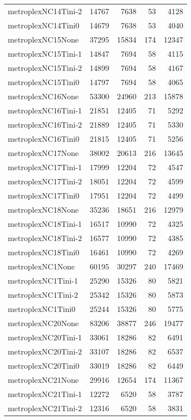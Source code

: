 \begin{longtable}{lrrrr}
metroplexNC14Tini-2 & 14767 & 7638 & 53 & 4128 \\
metroplexNC14Tini0 & 14679 & 7638 & 53 & 4040 \\
metroplexNC15None & 37295 & 15834 & 174 & 12347 \\
metroplexNC15Tini-1 & 14847 & 7694 & 58 & 4115 \\
metroplexNC15Tini-2 & 14899 & 7694 & 58 & 4167 \\
metroplexNC15Tini0 & 14797 & 7694 & 58 & 4065 \\
metroplexNC16None & 53300 & 24960 & 213 & 15878 \\
metroplexNC16Tini-1 & 21851 & 12405 & 71 & 5292 \\
metroplexNC16Tini-2 & 21889 & 12405 & 71 & 5330 \\
metroplexNC16Tini0 & 21815 & 12405 & 71 & 5256 \\
metroplexNC17None & 38002 & 20613 & 216 & 13645 \\
metroplexNC17Tini-1 & 17999 & 12204 & 72 & 4547 \\
metroplexNC17Tini-2 & 18051 & 12204 & 72 & 4599 \\
metroplexNC17Tini0 & 17951 & 12204 & 72 & 4499 \\
metroplexNC18None & 35236 & 18651 & 216 & 12979 \\
metroplexNC18Tini-1 & 16517 & 10990 & 72 & 4325 \\
metroplexNC18Tini-2 & 16577 & 10990 & 72 & 4385 \\
metroplexNC18Tini0 & 16461 & 10990 & 72 & 4269 \\
metroplexNC1None & 60195 & 30297 & 240 & 17469 \\
metroplexNC1Tini-1 & 25290 & 15326 & 80 & 5821 \\
metroplexNC1Tini-2 & 25342 & 15326 & 80 & 5873 \\
metroplexNC1Tini0 & 25244 & 15326 & 80 & 5775 \\
metroplexNC20None & 83206 & 38877 & 246 & 19477 \\
metroplexNC20Tini-1 & 33061 & 18286 & 82 & 6491 \\
metroplexNC20Tini-2 & 33107 & 18286 & 82 & 6537 \\
metroplexNC20Tini0 & 33019 & 18286 & 82 & 6449 \\
metroplexNC21None & 29916 & 12654 & 174 & 11367 \\
metroplexNC21Tini-1 & 12272 & 6520 & 58 & 3787 \\
metroplexNC21Tini-2 & 12316 & 6520 & 58 & 3831 \\

\end{longtable}
